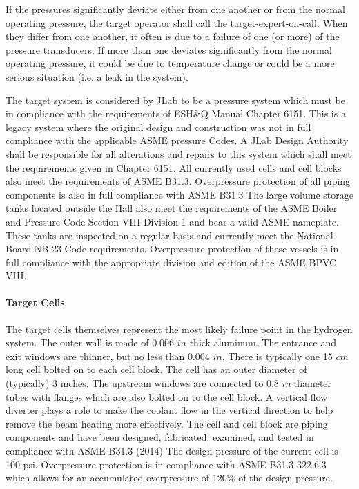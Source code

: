 If the pressures significantly deviate either from one another or
from the normal operating pressure, the target operator shall call
the target-expert-on-call. When they differ from one another, it often
is due to a failure of one (or more) of the pressure transducers.
If more than one deviates significantly from the normal operating pressure,
it could be due to temperature change or could be a more serious situation
(i.e. a leak in the system).

The target system is considered by JLab to be a pressure system which
must be in compliance with the requirements of ESH\&Q Manual Chapter
6151. This is a legacy system where the original design and
construction was not in full compliance with the applicable ASME
pressure Codes. A JLab Design Authority shall be responsible for all
alterations and repairs to this system which shall meet the
requirements given in Chapter 6151.  All currently used cells and cell
blocks also meet the requirements of ASME B31.3. Overpressure
protection of all piping components is also in full compliance with
ASME B31.3 The large volume storage tanks located outside the Hall
also meet the requirements of the ASME Boiler and Pressure Code
Section VIII Division 1 and bear a valid ASME nameplate. These tanks
are inspected on a regular basis and currently meet the National Board
NB-23 Code requirements. Overpressure protection of these vessels is
in full compliance with the appropriate division and edition of the
ASME BPVC VIII.


\paragraph{Target Cells}

The target cells themselves represent the most likely failure point in
the hydrogen system. The outer wall is made of 0.006 $in$ thick
aluminum. The entrance and exit windows are thinner, but no less than
0.004 $in$. There is typically one 15 $cm$ long cell bolted on to each
cell block. The cell has an outer diameter of (typically) 3
inches. The upstream windows are connected to 0.8 $in$ diameter tubes
with flanges which are also bolted on to the cell block. A vertical
flow diverter plays a role to make the coolant flow in the vertical
direction to help remove the beam heating more effectively. The cell
and cell block are piping components and have been designed,
fabricated, examined, and tested in compliance with ASME B31.3 (2014)
The design pressure of the current cell is 100 psi. Overpressure
protection is in compliance with ASME B31.3 322.6.3 which allows for
an accumulated overpressure of 120\% of the design pressure.


